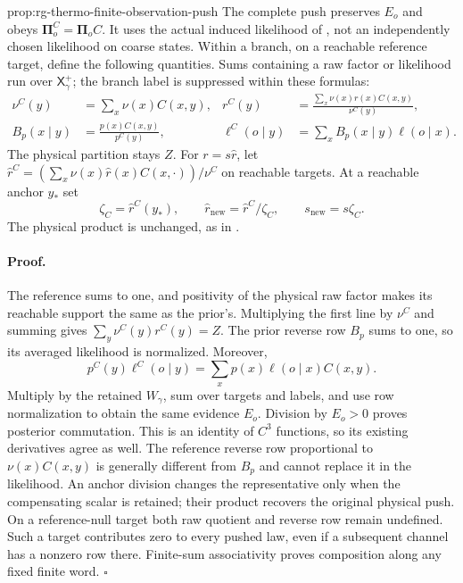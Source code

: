 {prop:rg-thermo-finite-observation-push}
The complete push preserves $E_o$ and obeys
$\boldsymbol\Pi_o^C=\boldsymbol\Pi_o C$. It uses the actual induced
likelihood of , not an independently
chosen likelihood on coarse states. Within a branch, on a reachable
reference target, define the following quantities. Sums containing a raw
factor or likelihood run over $\mathsf X_\gamma^+$; the branch label
is suppressed within these formulas:
\begin{align}
 \nu^C(y)&=\sum_x\nu(x)C(x,y),
 &r^C(y)&=\frac{\sum_x\nu(x)r(x)C(x,y)}{\nu^C(y)},
 \label{eq:rg-thermo-finite-raw-push}\\
 B_p(x\mid y)&=\frac{p(x)C(x,y)}{p^C(y)},
 &\ell^C(o\mid y)&=\sum_xB_p(x\mid y)\ell(o\mid x).
 \label{eq:rg-thermo-finite-induced-likelihood}
\end{align}
The physical partition stays $Z$. For $r=s\widehat r$, let
$\widehat r^C=(\sum_x\nu(x)\widehat r(x)C(x,\cdot))/\nu^C$
on reachable targets. At a reachable anchor $y_*$ set
\begin{equation}
 \zeta_C=\widehat r^C(y_*),\qquad
 \widehat r_{\mathrm{new}}=\widehat r^C/\zeta_C,\qquad
 s_{\mathrm{new}}=s\zeta_C.
 \label{eq:rg-thermo-finite-anchor}
\end{equation}
The physical product is unchanged, as in .\thermoestablishedstatus


\paragraph{Proof.}
The reference sums to one, and positivity of the physical raw factor
makes its reachable support the same as the prior's. Multiplying the
first line by $\nu^C$ and summing gives $\sum_y\nu^C(y)r^C(y)=Z$.
The prior reverse row $B_p$ sums to one, so its averaged likelihood is
normalized. Moreover,
\begin{equation}
 p^C(y)\ell^C(o\mid y)
       =\sum_xp(x)\ell(o\mid x)C(x,y).
 \label{eq:rg-thermo-finite-joint-push}
\end{equation}
Multiply by the retained $W_\gamma$, sum over targets and labels, and
use row normalization to obtain the same evidence $E_o$. Division by
$E_o>0$ proves posterior commutation. This is an identity of $C^3$
functions, so its existing derivatives agree as well. The reference
reverse row proportional to $\nu(x)C(x,y)$ is generally different from
$B_p$ and cannot replace it in the likelihood. An anchor division changes
the representative only when the compensating scalar is retained; their
product recovers the original physical push. On a reference-null target
both raw quotient and reverse row remain undefined. Such a target
contributes zero to every pushed law, even if a subsequent channel has a
nonzero row there. Finite-sum associativity proves composition along any
fixed finite word. $\square$

